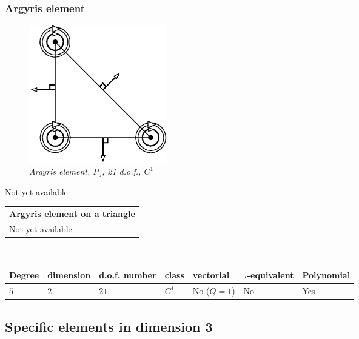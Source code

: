 \documentclass[11pt,a4paper]{article}
\begin{document}
\subsubsection{Argyris element}

\begin{figure}[H]
  \begin{center}
    \includegraphics[width=6cm,angle=0]{getfemlist_argyris.eps}
  \end{center}
  \caption{ \it Argyris element, $P_5$, 21 d.o.f., $C^1$}
  \label{fig:argyris}
\end{figure}
Not yet available

\begin{center}
\begin{tabular}{|m{16.11cm}|} \hline 
{ \bf Argyris element on a triangle}\\
Not yet available
\end{tabular} \\ \vspace{-1pt} 
\begin{tabular}{|m{2cm}|m{2cm}|m{2.5cm}|m{1.2cm}|m{2cm}|m{2cm}|m{1.8cm}|} \hline 
Degree & dimension & d.o.f. number & class & vectorial & \mbox{$\tau$-equivalent} & Polynomial\\ \hline
$5$ & $2$ & $21$ & $C^1$ & No \mbox{($Q = 1$)} & No & Yes\\ \hline
\end{tabular}
\end{center}

\subsection{Specific elements in dimension 3}
\end{document}
